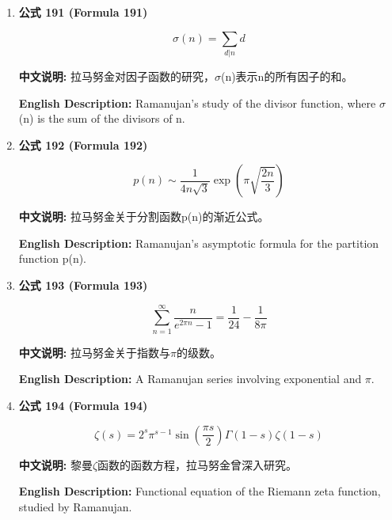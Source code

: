 \documentclass[12pt,a4paper]{article}
\begin{document}
\begin{enumerate}[leftmargin=*]
\vspace{0.5cm}

\item \textbf{公式 191 (Formula 191)}

\begin{equation}
\sigma(n) = \sum_{d|n} d
\end{equation}

\textbf{中文说明:} 拉马努金对因子函数的研究，$\sigma$(n)表示n的所有因子的和。

\textbf{English Description:} Ramanujan's study of the divisor function, where $\sigma$(n) is the sum of the divisors of n.

\vspace{0.5cm}

\item \textbf{公式 192 (Formula 192)}

\begin{equation}
p(n) \sim \frac{1}{4n\sqrt{3}} \exp\left(\pi\sqrt{\frac{2n}{3}}\right)
\end{equation}

\textbf{中文说明:} 拉马努金关于分割函数p(n)的渐近公式。

\textbf{English Description:} Ramanujan's asymptotic formula for the partition function p(n).

\vspace{0.5cm}

\item \textbf{公式 193 (Formula 193)}

\begin{equation}
\sum_{n=1}^{\infty} \frac{n}{e^{2\pi n}-1} = \frac{1}{24} - \frac{1}{8\pi}
\end{equation}

\textbf{中文说明:} 拉马努金关于指数与$\pi$的级数。

\textbf{English Description:} A Ramanujan series involving exponential and $\pi$.

\vspace{0.5cm}

\item \textbf{公式 194 (Formula 194)}

\begin{equation}
\zeta(s) = 2^s \pi^{s-1} \sin\left(\frac{\pi s}{2}\right) \Gamma(1-s) \zeta(1-s)
\end{equation}

\textbf{中文说明:} 黎曼$\zeta$函数的函数方程，拉马努金曾深入研究。

\textbf{English Description:} Functional equation of the Riemann zeta function, studied by Ramanujan.


\end{enumerate}
\end{document}
